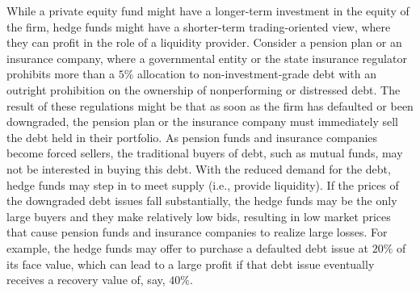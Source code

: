 \documentclass[11pt]{article}
\begin{document}
While a private equity fund might have a longer-term investment in the equity of the firm, hedge funds might have a shorter-term trading-oriented view, where they can profit in the role of a liquidity provider. Consider a pension plan or an insurance company, where a governmental entity or the state insurance regulator prohibits more than a $5 \%$ allocation to non-investment-grade debt with an outright prohibition on the ownership of nonperforming or distressed debt. The result of these regulations might be that as soon as the firm has defaulted or been downgraded, the pension plan or the insurance company must immediately sell the debt held in their portfolio. As pension funds and insurance companies become forced sellers, the traditional buyers of debt, such as mutual funds, may not be interested in buying this debt. With the reduced demand for the debt, hedge funds may step in to meet supply (i.e., provide liquidity). If the prices of the downgraded debt issues fall substantially, the hedge funds may be the only large buyers and they make relatively low bids, resulting in low market prices that cause pension funds and insurance companies to realize large losses. For example, the hedge funds may offer to purchase a defaulted debt issue at $20 \%$ of its face value, which can lead to a large profit if that debt issue eventually receives a recovery value of, say, $40 \%$.
\end{document}
